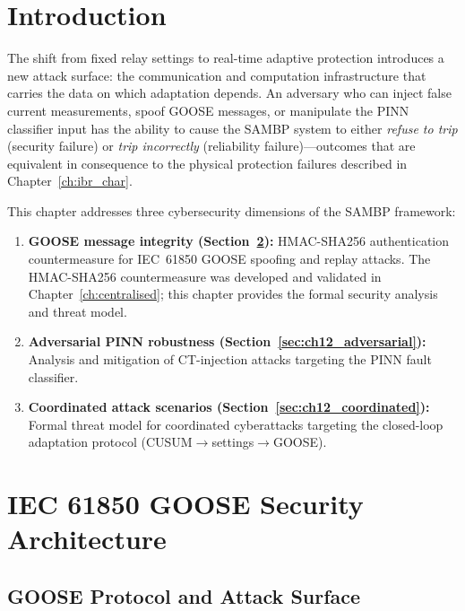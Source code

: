 \section{Introduction}
\label{sec:ch12_intro}

The shift from fixed relay settings to real-time adaptive protection
introduces a new attack surface: the communication and computation
infrastructure that carries the data on which adaptation depends.
An adversary who can inject false current measurements, spoof GOOSE
messages, or manipulate the PINN classifier input has the ability to
cause the SAMBP system to either \emph{refuse to trip} (security failure)
or \emph{trip incorrectly} (reliability failure)---outcomes that are
equivalent in consequence to the physical protection failures described
in Chapter~\ref{ch:ibr_char}.

This chapter addresses three cybersecurity dimensions of the SAMBP framework:

\begin{enumerate}
\item \textbf{GOOSE message integrity (Section~\ref{sec:ch12_goose}):}
      HMAC-SHA256 authentication countermeasure for IEC~61850 GOOSE
      spoofing and replay attacks. The HMAC-SHA256 countermeasure
      was developed and validated in Chapter~\ref{ch:centralised}; this
      chapter provides the formal security analysis and threat model.

\item \textbf{Adversarial PINN robustness (Section~\ref{sec:ch12_adversarial}):}
      Analysis and mitigation of CT-injection attacks targeting the PINN
      fault classifier.

\item \textbf{Coordinated attack scenarios (Section~\ref{sec:ch12_coordinated}):}
      Formal threat model for coordinated cyberattacks targeting the
      closed-loop adaptation protocol (CUSUM$\to$settings$\to$GOOSE).
\end{enumerate}

\section{IEC 61850 GOOSE Security Architecture}
\label{sec:ch12_goose}

\subsection{GOOSE Protocol and Attack Surface}

